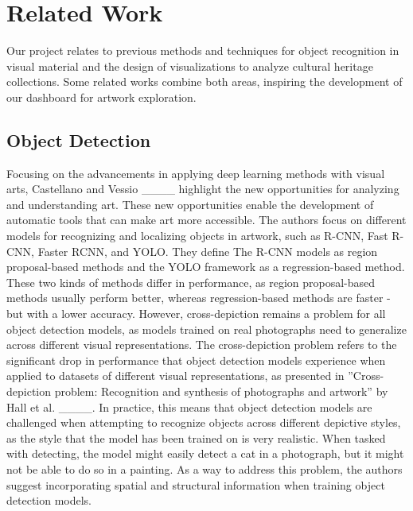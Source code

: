 \section{Related Work}
Our project relates to previous methods and techniques for object recognition in visual material and the design of visualizations to analyze cultural heritage collections. Some related works combine both areas, inspiring the development of our dashboard for artwork exploration.

\subsection{Object Detection}
Focusing on the advancements in applying deep learning methods with visual arts, Castellano and Vessio ____ highlight the new opportunities for analyzing and understanding art. These new opportunities enable the development of automatic tools that can make art more accessible. The authors focus on different models for recognizing and localizing objects in artwork, such as R-CNN, Fast R-CNN, Faster RCNN, and YOLO. They define The R-CNN models as region proposal-based methods and the YOLO framework as a regression-based method. These two kinds of methods differ in performance, as region proposal-based methods usually perform better, whereas regression-based methods are faster - but with a lower accuracy. However, cross-depiction remains a problem for all object detection models, as models trained on real photographs need to generalize across different visual representations. The cross-depiction problem refers to the significant drop in performance that object detection models experience when applied to datasets of different visual representations, as presented in ”Cross-depiction problem: Recognition and synthesis of photographs and artwork” by Hall et al. ____. In practice, this means that object detection models are challenged when attempting to recognize objects across different depictive styles, as the style that the model has been trained on is very realistic. When tasked with detecting, the model might easily detect a cat in a photograph, but it might not be able to do so in a painting. As a way to address this problem, the authors suggest incorporating spatial and structural information when training object detection models.


